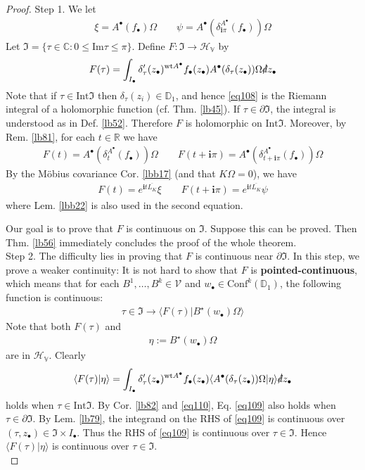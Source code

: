 \documentclass[12pt,b5paper,notitlepage]{article}
\theoremstyle{definition}
\theoremstyle{plain}
\newcommand{\fk}{\mathfrak}
\newcommand{\ovl}{\overline}
\newcommand{\Conf}{\mathrm{Conf}}
\newcommand{\bk}[1]{\langle {#1}\rangle}
\newcommand{\im}{\mathbf{i}}
\newcommand{\blt}{\bullet}
\newcommand{\Cbb}{\mathbb C}
\newcommand{\Rbb}{\mathbb R}
\newcommand{\Dbb}{\mathbb D}
\newcommand{\wt}{\mathrm{wt}}
\newcommand{\Imag}{\mathrm{Im}}
\newcommand{\Int}{\mathrm{Int}}
\newcommand{\HV}{\mathcal H_{\mathbb V}}
\newcommand{\sd}{\slashed{d}}
\newcommand{\MV}{\mathcal V}
\numberwithin{equation}{section}
\begin{document}
\begin{proof}
Step 1. We let
\begin{align*}
\xi=A^\blt(f_\blt)\Omega\qquad \psi=A^\blt(\delta_{\im\pi}^{A^\blt}(f_\blt))\Omega
\end{align*}
Let $\fk I=\{\tau\in\Cbb:0\leq\Imag\tau\leq\pi\}$. Define $F:\fk I\rightarrow\HV$ by
\begin{gather}\label{eq108}
F(\tau)=\int_{I_\blt}\delta'_\tau(z_\blt)^{\wt A^\blt}f_\blt(z_\blt)A^\blt(\delta_\tau(z_\blt))\Omega\sd z_\blt
\end{gather}
Note that if $\tau\in\Int\fk I$ then $\delta_\tau(z_i)\in\Dbb_1$, and hence \eqref{eq108} is the Riemann integral of a holomorphic function (cf. Thm. \ref{lb45}). If $\tau\in\partial\fk I$, the integral is understood as in Def. \ref{lb52}. Therefore $F$ is holomorphic on $\Int\fk I$. Moreover, by Rem. \ref{lb81}, for each $t\in\Rbb$ we have
\begin{gather}\label{eq110}
F(t)=A^\blt(\delta_t^{A^\blt}(f_\blt))\Omega\qquad F(t+\im\pi)=A^\blt(\delta_{t+\im\pi}^{A^\blt}(f_\blt))\Omega
\end{gather}
By the M\"obius covariance Cor. \ref{lbb17} (and that $K\Omega=0$), we have
\begin{align}\label{eq111}
F(t)=e^{\im t\ovl{L_K}}\xi\qquad F(t+\im\pi)=e^{\im t\ovl{L_K}}\psi
\end{align}
where Lem. \ref{lbb22} is also used in the second equation.

Our goal is to prove that $F$ is continuous on $\fk I$. Suppose this can be proved. Then Thm. \ref{lb56} immediately concludes the proof of the whole theorem.\\[-1ex]

Step 2. The difficulty lies in proving that $F$ is continuous near $\partial\fk I$. In this step, we prove a weaker continuity: It is not hard to show that $F$ is \textbf{pointed-continuous}, which means that for each $B^1,\dots,B^k\in\MV$ and $w_\blt\in\Conf^k(\Dbb_1)$, the following function is continuous:
\begin{align*}
\tau\in\fk I\rightarrow \bk{F(\tau)|B^\star(w_\blt)\Omega}
\end{align*}
Note that both $F(\tau)$ and
\begin{align}\label{eq112}
\eta:=B^\star(w_\blt)\Omega
\end{align}
are in $\HV$. Clearly
\begin{align}\label{eq109}
\bk{F(\tau)|\eta}=\int_{I_\blt}\delta'_\tau(z_\blt)^{\wt A^\blt}f_\blt(z_\blt)\bk{A^\blt(\delta_\tau(z_\blt))\Omega|\eta}\sd z_\blt
\end{align}
holds when $\tau\in\Int\fk I$. By Cor. \ref{lb82} and \eqref{eq110}, Eq. \eqref{eq109} also holds when $\tau\in\partial\fk I$. By Lem. \ref{lb79}, the integrand on the RHS of \eqref{eq109} is continuous over $(\tau,z_\blt)\in\fk I\times I_\blt$. Thus the RHS of \eqref{eq109} is continuous over $\tau\in\fk I$. Hence $\bk{F(\tau)|\eta}$ is continuous over $\tau\in\fk I$.\\[-1ex]



\end{proof}
\end{document}

